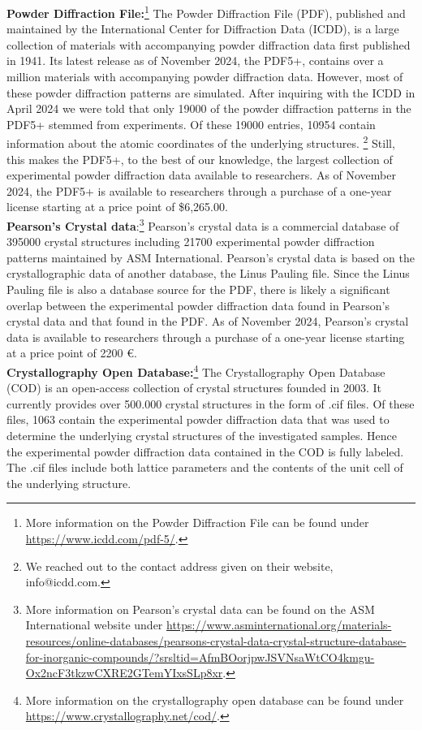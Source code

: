 \textbf{Powder Diffraction File:}\footnote{More information on the Powder Diffraction File can be found under \url{https://www.icdd.com/pdf-5/}.} The Powder Diffraction File (PDF), published and maintained by the International Center for Diffraction Data (ICDD), is a large collection of materials with accompanying powder diffraction data first published in 1941. \cite{GatesRector2019} Its latest release as of November 2024, the PDF5+, contains over a million materials with accompanying powder diffraction data. However, most of these powder diffraction patterns are simulated. After inquiring with the ICDD in April 2024 we were told that only 19000 of the powder diffraction patterns in the PDF5+ stemmed from experiments. Of these 19000 entries, 10954 contain information about the atomic coordinates of the underlying structures. \footnote{We reached out to the contact address given on their website, info@icdd.com.} Still, this makes the PDF5+, to the best of our knowledge, the largest collection of experimental powder diffraction data available to researchers. As of November 2024, the PDF5+ is available to researchers through a purchase of a one-year license starting at a price point of \$6,265.00.\\


\textbf{Pearson's Crystal data}:\footnote{More information on Pearson's crystal data can be found on the ASM International website under \url{https://www.asminternational.org/materials-resources/online-databases/pearsons-crystal-data-crystal-structure-database-for-inorganic-compounds/?srsltid=AfmBOorjpwJSVNsaWtCO4kmgu-Ox2ncF3tkzwCXRE2GTemYIxsSLp8xr}.} Pearson's crystal data is a commercial database of 395000 crystal structures including 21700 experimental powder diffraction patterns maintained by ASM International. Pearson's crystal data is based on the crystallographic data of another database, the Linus Pauling file. \cite{kaduk2007} Since the Linus Pauling file is also a database source for the PDF, there is likely a significant overlap between the experimental powder diffraction data found in Pearson's crystal data and that found in the PDF. As of November 2024, Pearson's crystal data is available to researchers through a purchase of a one-year license starting at a price point of 2200 \euro.\\

\textbf{Crystallography Open Database:}\footnote{More information on the crystallography open database can be found under \url{https://www.crystallography.net/cod/}.} The Crystallography Open Database (COD) is an open-access collection of crystal structures founded in 2003. \cite{Graulis2009cod} It currently provides over 500.000 crystal structures in the form of .cif files. Of these files, 1063 contain the experimental powder diffraction data that was used to determine the underlying crystal structures of the investigated samples. Hence the experimental powder diffraction data contained in the COD is fully labeled. The .cif files include both lattice parameters and the contents of the unit cell of the underlying structure. \\

